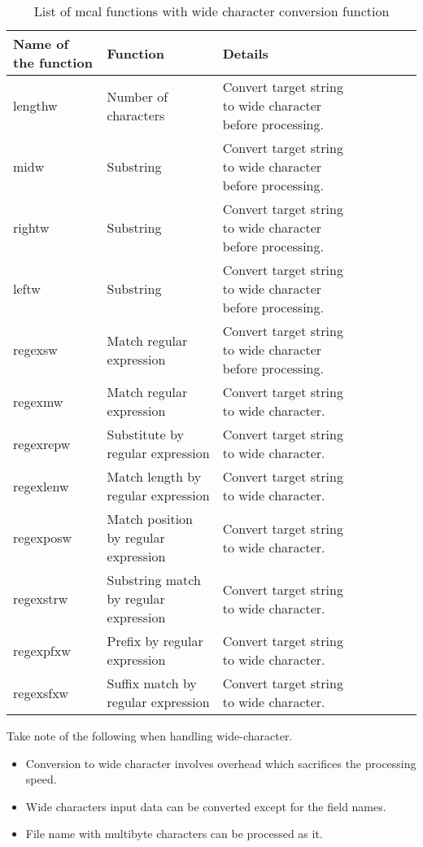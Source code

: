 \begin{table}[t]
\begin{center}
\caption{List of mcal functions with wide character conversion function\label{tbl:wide_mcal}}
\begin{tabular}{lp{2cm}lp{3cm}lp{6cm}l}
\hline
Name of the function    & Function & Details \\
\hline
lengthw   & Number of characters     & Convert target string to wide character before processing. \\
midw      & Substring & Convert target string to wide character before processing. \\
rightw    & Substring & Convert target string to wide character before processing.  \\
leftw     & Substring & Convert target string to wide character before processing.  \\
regexsw   & Match regular expression & Convert target string to wide character before processing.  \\
regexmw   & Match regular expression  & Convert target string to wide character. \\
regexrepw & Substitute by regular expression   & Convert target string to wide character. \\
regexlenw & Match length by regular expression & Convert target string to wide character. \\
regexposw & Match position by regular expression & Convert target string to wide character.   \\
regexstrw & Substring match by regular expression  & Convert target string to wide character.  \\
regexpfxw & Prefix by regular expression & Convert target string to wide character.  \\
regexsfxw & Suffix match by regular expression & Convert target string to wide character.  \\
\hline
\end{tabular}
\end{center}
\end{table}

Take note of the following when handling wide-character.
\begin{itemize}
\item Conversion to wide character involves overhead which sacrifices the processing speed.
\item Wide characters input data can be converted except for the field names. 
\item File name with multibyte characters can be processed as it. 
 \end{itemize}

%

